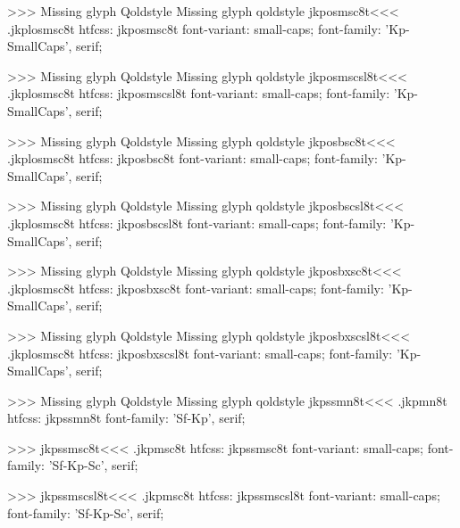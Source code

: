 >>>
Missing glyph	Qoldstyle
Missing glyph	qoldstyle
\<jkposmsc8t\><<<
.jkplosmsc8t
htfcss:  jkposmsc8t  font-variant: small-caps; font-family: 'Kp-SmallCaps', serif;

>>>
Missing glyph	Qoldstyle
Missing glyph	qoldstyle
\<jkposmscsl8t\><<<
.jkplosmsc8t
htfcss:  jkposmscsl8t  font-variant: small-caps; font-family: 'Kp-SmallCaps', serif;

>>>
Missing glyph	Qoldstyle
Missing glyph	qoldstyle
\<jkposbsc8t\><<<
.jkplosmsc8t
htfcss:  jkposbsc8t  font-variant: small-caps; font-family: 'Kp-SmallCaps', serif;

>>>
Missing glyph	Qoldstyle
Missing glyph	qoldstyle
\<jkposbscsl8t\><<<
.jkplosmsc8t
htfcss:  jkposbscsl8t  font-variant: small-caps; font-family: 'Kp-SmallCaps', serif;

>>>
Missing glyph	Qoldstyle
Missing glyph	qoldstyle
\<jkposbxsc8t\><<<
.jkplosmsc8t
htfcss:  jkposbxsc8t  font-variant: small-caps; font-family: 'Kp-SmallCaps', serif;

>>>
Missing glyph	Qoldstyle
Missing glyph	qoldstyle
\<jkposbxscsl8t\><<<
.jkplosmsc8t
htfcss:  jkposbxscsl8t  font-variant: small-caps; font-family: 'Kp-SmallCaps', serif;

>>>
Missing glyph	Qoldstyle
Missing glyph	qoldstyle
\<jkpssmn8t\><<<
.jkpmn8t
htfcss:  jkpssmn8t  font-family: 'Sf-Kp', serif;

>>>
\<jkpssmsc8t\><<<
.jkpmsc8t
htfcss:  jkpssmsc8t  font-variant: small-caps; font-family: 'Sf-Kp-Sc', serif;

>>>
\<jkpssmscsl8t\><<<
.jkpmsc8t
htfcss:  jkpssmscsl8t  font-variant: small-caps; font-family: 'Sf-Kp-Sc', serif;

